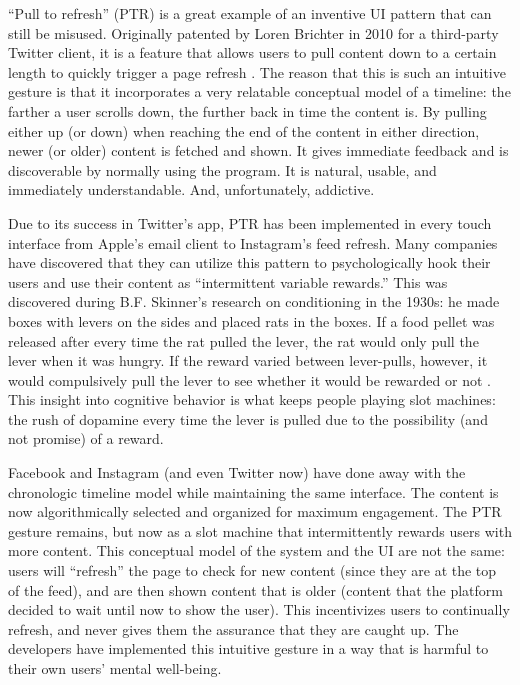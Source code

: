 \documentclass[12pt, oneside]{article}
\begin{document}
``Pull to refresh'' (PTR) is a great example of an inventive UI pattern that can still be misused. Originally patented by Loren Brichter in 2010 for a third-party Twitter client, it is a feature that allows users to pull content down to a certain length to quickly trigger a page refresh \cite{office_2010}. The reason that this is such an intuitive gesture is that it incorporates a very relatable conceptual model of a timeline: the farther a user scrolls down, the further back in time the content is. By pulling either up (or down) when reaching the end of the content in either direction, newer (or older) content is fetched and shown. It gives immediate feedback and is discoverable by normally using the program. It is natural, usable, and immediately understandable. And, unfortunately, addictive.

Due to its success in Twitter's app, PTR has been implemented in every touch interface from Apple's email client to Instagram's feed refresh. Many companies have discovered that they can utilize this pattern to psychologically hook their users and use their content as ``intermittent variable rewards.'' This was discovered during B.F. Skinner's research on conditioning in the 1930s: he made boxes with levers on the sides and placed rats in the boxes. If a food pellet was released after every time the rat pulled the lever, the rat would only pull the lever when it was hungry. If the reward varied between lever-pulls, however, it would compulsively pull the lever to see whether it would be rewarded or not \cite{leslie_2016}. This insight into cognitive behavior is what keeps people playing slot machines: the rush of dopamine every time the lever is pulled due to the possibility (and not promise) of a reward.

Facebook and Instagram (and even Twitter now) have done away with the chronologic timeline model while maintaining the same interface. The content is now algorithmically selected and organized for maximum engagement. The PTR gesture remains, but now as a slot machine that intermittently rewards users with more content. This conceptual model of the system and the UI are not the same: users will ``refresh'' the page to check for new content (since they are at the top of the feed), and are then shown content that is older (content that the platform decided to wait until now to show the user). This incentivizes users to continually refresh, and never gives them the assurance that they are caught up. The developers have implemented this intuitive gesture in a way that is harmful to their own users' mental well-being.
\end{document}
